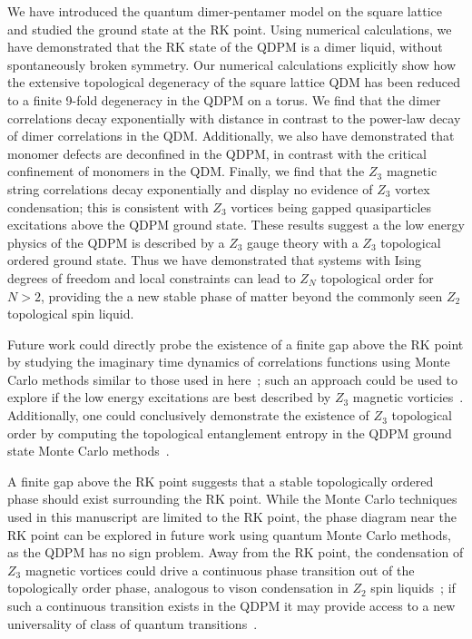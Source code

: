 \documentclass[twocolumn,prb,aps,floatfix,superscriptaddress]{revtex4-1}
\begin{document}
We have introduced the quantum dimer-pentamer model on the square lattice and studied the ground state at the RK point. Using numerical calculations, we have demonstrated that the RK state of the QDPM is a dimer liquid, without spontaneously broken symmetry. Our numerical calculations explicitly show how the extensive topological degeneracy of the square lattice QDM has been reduced to a finite 9-fold degeneracy in the QDPM on a torus. We find that the dimer correlations decay exponentially with distance in contrast to the power-law decay of dimer correlations in the QDM. Additionally, we also have demonstrated that monomer defects are deconfined in the QDPM, in contrast with the critical confinement of monomers in the QDM. Finally, we find that the $Z_3$ magnetic string correlations decay exponentially and display no evidence of $Z_3$ vortex condensation; this is consistent with $Z_3$ vortices being gapped quasiparticles excitations above the QDPM ground state. These results suggest a the low energy physics of the QDPM is described by a $Z_3$ gauge theory with a $Z_3$ topological ordered ground state. Thus we have demonstrated that systems with Ising degrees of freedom and local constraints can lead to $Z_N$ topological order for $N>2$, providing the a new stable phase of matter beyond the commonly seen $Z_2$ topological spin liquid.

Future work could directly probe the existence of a finite gap above the RK point by studying the imaginary time dynamics of correlations functions using Monte Carlo methods similar to those used in here~\cite{Henley1997,Henley2004a}; such an approach could be used to explore if the low energy excitations are best described by $Z_3$ magnetic vorticies~\cite{Ivanov2004,Ralko2007,Misguich2008d}. Additionally, one could conclusively demonstrate the existence of $Z_3$ topological order by computing the topological entanglement entropy in the QDPM ground state Monte Carlo methods~\cite{Levin2005a,Kitaev2006b,Hastings2010}. 

A finite gap above the RK point suggests that a stable topologically ordered phase should exist surrounding the RK point. While the Monte Carlo techniques used in this manuscript are limited to the RK point, the phase diagram near the RK point can be explored in future work using quantum Monte Carlo methods, as the QDPM has no sign problem. Away from the RK point, the condensation of $Z_3$ magnetic vortices could drive a continuous phase transition out of the topologically order phase, analogous to vison condensation in $Z_2$ spin liquids~\cite{Jalabert1991,Ralko2007,Huh2011,Hao2014,Slagle2014}; if such a continuous transition exists in the QDPM it may provide access to a new universality of class of quantum transitions~\cite{XU2012}.
\end{document}
